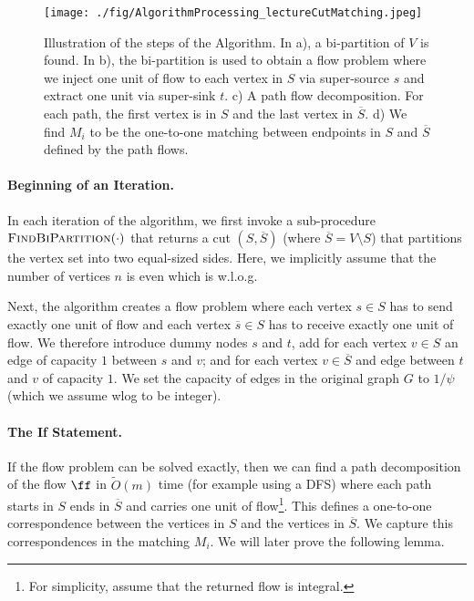 \begin{figure}[!ht]
    \centering
    \texttt{[image: ./fig/AlgorithmProcessing\_lectureCutMatching.jpeg]}
    \caption{Illustration of the steps of the Algorithm. In a), a bi-partition of $V$ is found. In b), the bi-partition is used to obtain a flow problem where we inject one unit of flow to each vertex in $S$ via super-source $s$ and extract one unit via super-sink $t$. c) A path flow decomposition. For each path, the first vertex is in $S$ and the last vertex in $\overline{S}$. d) We find $M_i$ to be the one-to-one matching between endpoints in $S$ and $\overline{S}$ defined by the path flows.}
    \label{fig:my_label}
\end{figure}

\paragraph{Beginning of an Iteration.} In each iteration of the algorithm, we first invoke a sub-procedure $\textsc{FindBiPartition}(\cdot)$ that returns a cut $(S,\overline{S})$ (where $\overline{S} = V \setminus S$) that partitions the vertex set into two equal-sized sides. Here, we implicitly assume that the number of vertices $n$ is even which is w.l.o.g. 

Next, the algorithm creates a flow problem where each vertex $s \in S$ has to send exactly one unit of flow and each vertex $\overline{s} \in S$ has to receive exactly one unit of flow. We therefore introduce dummy nodes $s$ and $t$, add for each vertex $v \in S$ an edge of capacity $1$ between $s$ and $v$; and for each vertex $v \in \overline{S}$ and edge between $t$ and $v$ of capacity $1$. We set the capacity of edges in the original graph $G$ to $1/\psi$ (which we assume wlog to be integer).

\paragraph{The If Statement.} If the flow problem can be solved exactly, then we can find a path decomposition of the flow $\ff$ in $\tilde{O}(m)$ time (for example using a DFS) where each path starts in $S$ ends in $\overline{S}$ and carries one unit of flow\footnote{For simplicity, assume that the returned flow is integral.}. This defines a one-to-one correspondence between the vertices in $S$ and the vertices in $\overline{S}$. We capture this correspondences in the matching $M_i$. We will later prove the following lemma.


